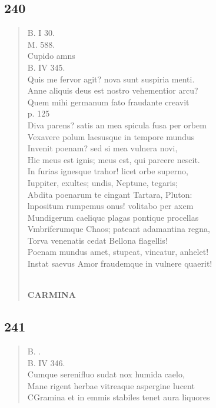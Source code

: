 \documentclass[11pt, a4paper]{report}
\begin{document}
            \subsection*{240}
      \begin{verse}
      B. I 30. \\ M. 588. \\ Cupido amns \\ B. IV 345. \\ Quis me fervor agit? nova sunt suspiria menti. \\ Anne aliquis deus est nostro vehementior arcu? \\ Quem mihi germanum fato fraudante creavit \\ p. 125 \\ Diva parens?  \lbrack satis \rbrack  an  \lbrack mea \rbrack  spicula fusa per orbem \\ Vexavere polum laesusque in tempore mundus \\ Invenit poenam? sed si mea vulnera novi, \\ Hic meus est ignis; meus est, qui parcere nescit. \\ In furias ignesque trahor! licet orbe superno, \\ Iuppiter, exultes; undis, Neptune, tegaris; \\ Abdita poenarum te cingant Tartara, Pluton: \\ lnpositum rumpemus onus! volitabo per axem \\ Mundigerum caeliquc plagas pontique procellas \\ Vmbriferumque Chaos; pateant adamantina regna, \\ Torva venenatis cedat Bellona flagellis! \\ Poenam mundus amet, stupeat, vincatur, anhelet! \\ Instat saevus Amor fraudemque in vulnere quaerit! \\ 
        ﻿\pagebreak 
     \marginpar{[198]} \begin{center} \textbf{CARMINA} \end{center}
      \end{verse}
  
            \subsection*{241}
      \begin{verse}
      B. . \\ B. IV 346. \\ Cumque serenifluo sudat nox humida caelo, \\ Mane rigent herbae vitreaque aspergine lucent \\ CGramina et in emmis stabiles tenet aura liquores \\ 
      \end{verse}
  
\end{document}
